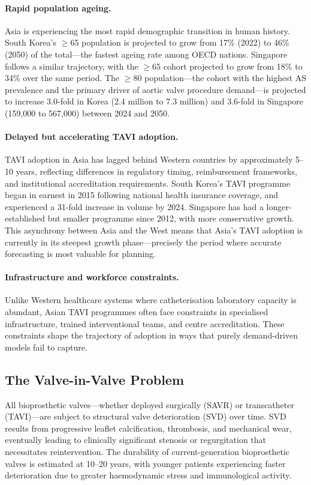 \documentclass[12pt, a4paper]{article}
\begin{document}
\paragraph{Rapid population ageing.}
Asia is experiencing the most rapid demographic transition in human history. South Korea's $\geq$65 population is projected to grow from 17\% (2022) to 46\% (2050) of the total---the fastest ageing rate among OECD nations. Singapore follows a similar trajectory, with the $\geq$65 cohort projected to grow from 18\% to 34\% over the same period. The $\geq$80 population---the cohort with the highest AS prevalence and the primary driver of aortic valve procedure demand---is projected to increase 3.0-fold in Korea (2.4 million to 7.3 million) and 3.6-fold in Singapore (159,000 to 567,000) between 2024 and 2050.

\paragraph{Delayed but accelerating TAVI adoption.}
TAVI adoption in Asia has lagged behind Western countries by approximately 5--10 years, reflecting differences in regulatory timing, reimbursement frameworks, and institutional accreditation requirements. South Korea's TAVI programme began in earnest in 2015 following national health insurance coverage, and experienced a 31-fold increase in volume by 2024. Singapore has had a longer-established but smaller programme since 2012, with more conservative growth. This asynchrony between Asia and the West means that Asia's TAVI adoption is currently in its steepest growth phase---precisely the period where accurate forecasting is most valuable for planning.

\paragraph{Infrastructure and workforce constraints.}
Unlike Western healthcare systems where catheterisation laboratory capacity is abundant, Asian TAVI programmes often face constraints in specialised infrastructure, trained interventional teams, and centre accreditation. These constraints shape the trajectory of adoption in ways that purely demand-driven models fail to capture.

\subsection{The Valve-in-Valve Problem}

All bioprosthetic valves---whether deployed surgically (SAVR) or transcatheter (TAVI)---are subject to structural valve deterioration (SVD) over time. SVD results from progressive leaflet calcification, thrombosis, and mechanical wear, eventually leading to clinically significant stenosis or regurgitation that necessitates reintervention. The durability of current-generation bioprosthetic valves is estimated at 10--20 years, with younger patients experiencing faster deterioration due to greater haemodynamic stress and immunological activity.
\end{document}
